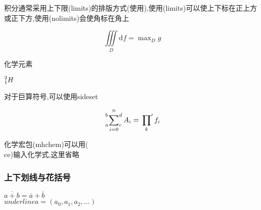 \documentclass[UTF8]{ctexart}
\begin{document}
        积分通常采用上下限(limits)的排版方式(使用),使用(limits)可以使上下标在正上方或正下方,使用(nolimits)会使角标在角上
        \begin{codeshow}
          \[
            \iiint\limits_D \mathrm{d}f
             = \max \nolimits_D g
          \]
        \end{codeshow}


        化学元素
        \begin{codeshow}
          $\prescript{2}{1}{H}$
        \end{codeshow}

        对于巨算符号,可以使用sideset
        \begin{codeshow}
          \[ \sideset{_a^b}{_c^d}
          \sum_{i=0}^n A_i
          = \sideset{}{'}
          \prod_k f_i \]
        \end{codeshow}

        化学宏包(mhchem)可以用(\\ce)输入化学式,这里省略

        \subsubsection{上下划线与花括号}
        \begin{codeshow}
          $\overline{a+b} =
          \overline a + \overline b$ \\
          $ underline a = (a_0,a_1,a_2, \dots) $
        \end{codeshow}
\end{document}

